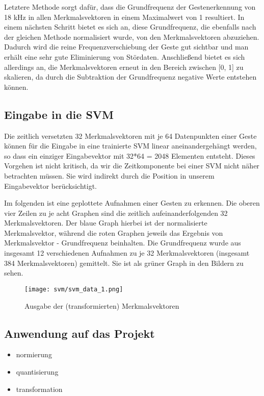 Letztere Methode sorgt dafür, dass die Grundfrequenz der Gestenerkennung von 18 kHz in allen Merkmalsvektoren in einem Maximalwert von 1 resultiert. 
In einem nächsten Schritt bietet es sich an, diese Grundfrequenz, die ebenfalls nach der gleichen Methode normalisiert wurde, von den Merkmalsvektoren abzuziehen. 
Dadurch wird die reine Frequenzverschiebung der Geste gut sichtbar und man erhält eine sehr gute Eliminierung von Stördaten. 
Anschließend bietet es sich allerdings an, die Merkmalsvektoren erneut in den Bereich zwischen [0, 1] zu skalieren, da durch die Subtraktion der Grundfrequenz negative Werte entstehen können.


\subsection{Eingabe in die SVM}

Die zeitlich versetzten 32 Merkmalsvektoren mit je 64 Datenpunkten einer Geste können für die Eingabe in eine trainierte SVM linear aneinandergehängt werden, so dass ein einziger Eingabevektor mit 32*64 = 2048 Elementen entsteht. 
Dieses Vorgehen ist nicht kritisch, da wir die Zeitkomponente bei einer SVM nicht näher betrachten müssen. 
Sie wird indirekt durch die Position in unserem Eingabevektor berücksichtigt.

Im folgenden ist eine geplottete Aufnahmen einer Gesten zu erkennen. 
Die oberen vier Zeilen zu je acht Graphen sind die zeitlich aufeinanderfolgenden 32 Merkmalsvektoren. 
Der blaue Graph hierbei ist der normalisierte Merkmalsvektor, während die roten Graphen jeweils das Ergebnis von Merkmalsvektor - Grundfrequenz beinhalten. 
Die Grundfrequenz wurde aus insgesamt 12 verschiedenen Aufnahmen zu je 32 Merkmalsvektoren (insgesamt 384 Merkmalsvektoren) gemittelt. 
Sie ist als grüner Graph in den Bildern zu sehen.

\begin{figure}[h!]
  \centering
    \texttt{[image: svm/svm\_data\_1.png]}
  \caption{Ausgabe der (transformierten) Merkmalsvektoren}
\end{figure}


\newpage 
\subsection{Anwendung auf das Projekt}
\begin{itemize}
\item{normierung}
\item{quantisierung}
\item{transformation}
\end{itemize}

